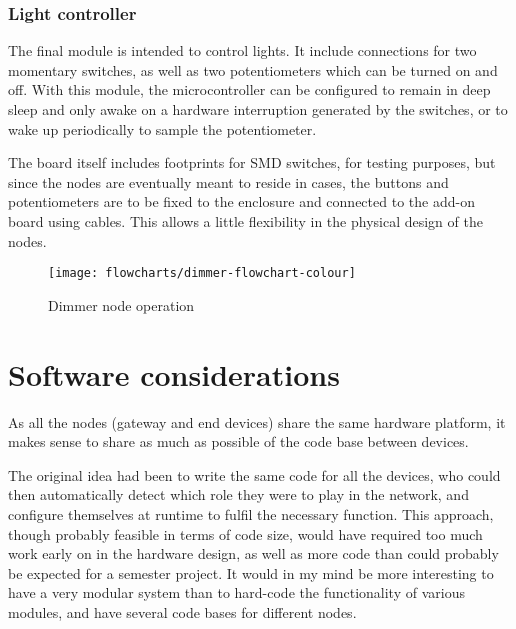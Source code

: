 \subsubsection{Light controller}

The final module is intended to control lights. It include connections for two
momentary switches, as well as two potentiometers which can be turned on and
off. With this module, the microcontroller can be configured to remain in deep
sleep and only awake on a hardware interruption generated by the switches, or to
wake up periodically to sample the potentiometer.

The board itself includes footprints for SMD switches, for testing purposes, but
since the nodes are eventually meant to reside in cases, the buttons and
potentiometers are to be fixed to the enclosure and connected to the add-on
board using cables. This allows a little flexibility in the physical design of
the nodes.

\begin{figure}[!h]
  \begin{center}
    \texttt{[image: flowcharts/dimmer-flowchart-colour]}
  \end{center}
  \caption{Dimmer node operation}
  \label{fig:dimmer-flowchart}
\end{figure}





\section{Software considerations}

As all the nodes (gateway and end devices) share the same hardware platform, it
makes sense to share as much as possible of the code base between devices.

The original idea had been to write the same code for all the devices, who could
then automatically detect which role they were to play in the network, and
configure themselves at runtime to fulfil the necessary function. This approach,
though probably feasible in terms of code size, would have required too much
work early on in the hardware design, as well as more code than could probably
be expected for a semester project. It would in my mind be more interesting to
have a very modular system than to hard-code the functionality of various
modules, and have several code bases for different nodes.

